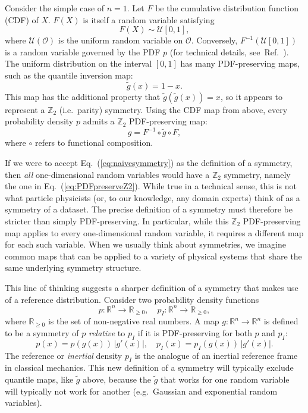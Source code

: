 \documentclass[aps,prx,reprint,preprintnumbers,superscriptaddress,nofootinbib,longbibliography,floatfix]{revtex4-1}
\renewcommand{\O}{\mathcal{O}}
\DeclareRobustCommand{\Eq}[1]{Eq.~(\ref{eq:#1})}
\DeclareRobustCommand{\Ref}[1]{Ref.~\cite{#1}}
\begin{document}
Consider the simple case of $n=1$.
%
Let $F$ be the cumulative distribution function (CDF) of $X$.
%
$F(X)$ is itself a random variable satisfying 
%
\begin{equation}
    F(X)\sim\mathcal{U}[0,1],
\end{equation}
%
where $\mathcal{U}(\O)$ is the uniform random variable on $\O$.
%
Conversely, $F^{-1}(\mathcal{U}[0,1])$ is a random variable governed by the PDF $p$ (for technical details, see~\Ref{10.2307/2132726}).
%
The uniform distribution on the interval $[0,1]$ has many PDF-preserving maps, such as the quantile inversion map:
%
\begin{equation}
\widetilde{g}(x)=1-x.
\end{equation}
%
This map has the additional property that $\widetilde{g}(\widetilde{g}(x))=x$, so it appears to represent a $\mathbb{Z}_2$ (i.e.~parity) symmetry.
%
Using the CDF map from above, every probability density $p$ admits a $\mathbb{Z}_2$ PDF-preserving map:
%
\begin{equation}
\label{eq:PDFpreserveZ2}
    g=F^{-1}\circ\widetilde{g}\circ F,
\end{equation}
where $\circ$ refers to functional composition.

If we were to accept \Eq{naivesymmetry} as the definition of a symmetry, then \emph{all} one-dimensional random variables would have a $\mathbb{Z}_2$ symmetry, namely the one in \Eq{PDFpreserveZ2}.
%
While true in a technical sense, this is not what particle physicists (or, to our knowledge, any domain experts) think of as a symmetry of a dataset.
%
The precise definition of a symmetry must therefore be stricter than simply PDF-preserving.
%
In particular, while this $\mathbb{Z}_2$ PDF-preserving map applies to every one-dimensional random variable, it requires a different map for each such variable.
%
When we usually think about symmetries, we imagine common maps that can be applied to a variety of physical systems that share the same underlying symmetry structure.




This line of thinking suggests a sharper definition of a symmetry that makes use of a reference distribution.
%
Consider two probability density functions
%
\begin{equation}
\label{eq:twoPDFs}
p:\mathbb{R}^n\rightarrow\mathbb{R}_{\ge0}, \quad p_I:\mathbb{R}^n\rightarrow\mathbb{R}_{\ge0},
\end{equation}
where $\mathbb{R}_{\ge0}$ is the set of non-negative real numbers.
%
A map $g:\mathbb{R}^n\rightarrow\mathbb{R}^n$ is defined to be a symmetry of $p$ \emph{relative} to $p_I$ if it is PDF-preserving for both $p$ and $p_I$:
%
\begin{equation}
\label{eq:improvedsymmetry}
p(x) = p(g(x)) \, |g'(x)|, \quad p_I(x) = p_I(g(x)) \, |g'(x)|.
\end{equation}
%
The reference or \textit{inertial} density $p_I$ is the analogue of an inertial reference frame in classical mechanics.
%
This new definition of a symmetry will typically exclude quantile maps, like $\widetilde{g}$ above, because the $\widetilde{g}$ that works for one random variable will typically not work for another (e.g.\ Gaussian and exponential random variables).
\end{document}
